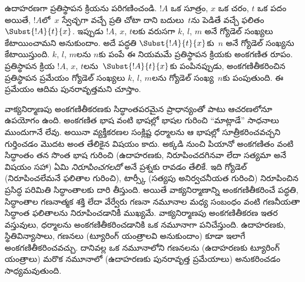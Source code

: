 \documentclass[../../../include/open-logic-section]{subfiles}
\begin{document}
ఉదాహరణగా ప్రతిస్థాపన క్రియను పరిగణించండి. $!A$ ఒక సూత్రం, $x$ ఒక చరం,
$t$ ఒక పదం అయితే, $!A$లో~$x$ స్వేచ్ఛగా వచ్చే ప్రతి చోటా దాని బదులు~$t$ను
పెడితే వచ్చే ఫలితం $\Subst{!A}{t}{x}$. ఇప్పుడు $!A$, $x$, $t$లకు వరుసగా
$k$, $l$, $m$ అనే గ్యోడెల్ సంఖ్యలు కేటాయించామని అనుకుందాం. అదే పద్ధతి
$\Subst{!A}{t}{x}$కు~$n$ అనే గ్యోడెల్ సంఖ్యను కేటాయిస్తుంది. $k$, $l$, $m$లను
$n$కు పంపే ఈ నియమమే ప్రతిస్థాపన క్రియకు అంకగణిత రూపం. ప్రతిస్థాపన
క్రియ $!A$, $x$, $t$లను~$\Subst{!A}{t}{x}$కు పంపినప్పుడు, అంకగణితీకరించిన
ప్రతిస్థాపన ప్రమేయం గ్యోడెల్ సంఖ్యలు $k$, $l$, $m$లను గ్యోడెల్ సంఖ్య~$n$కు
పంపుతుంది. ఈ ప్రమేయం ఆదిమ పునరావృత్తమని చూస్తాం.

వాక్యనిర్మాణపు అంకగణితీకరణకు సిద్ధాంతపరమైన ప్రాధాన్యంతో పాటు ఆచరణలోనూ ఉపయోగం
ఉంది. అంకగణిత భాష వంటి భాషల్లో భాషల గురించి ``మాట్లాడే'' సాధనాలు
ముందుగానే లేవు. అయినా వ్యక్తీకరణల సంక్లిష్ట ధర్మాలను ఆ భాషల్లో
సూత్రీకరించవచ్చని గుర్తించడం మొదట అంత తేలికైన విషయం కాదు. అక్కడి నుంచి పియానో అంకగణితం వంటి సిద్ధాంతం తన
సొంత భాష గురించి (ఉదాహరణకు, 
నిరూపించదగినవా లేదా సత్యమా అనే విషయం సహా) ఏమి \emph{నిరూపించగలదో}
అనే ప్రశ్నకు రావడం తేలికే. ఇది గ్యోడెల్ (నిరూపించలేమనే
ఫలితాల గురించి), టార్స్కీ (సత్యపు అనిర్వచనీయత గురించి) నిరూపించిన ప్రసిద్ధ
పరిమితి సిద్ధాంతాలకు దారి తీస్తుంది. అయితే వాక్యనిర్మాణాన్ని అంకగణితీకరించే పద్ధతి,
సిద్ధాంతాల గణనాత్మక శక్తి లేదా వేర్వేరు గణనా నమూనాల మధ్య సంబంధం వంటి
గణనీయతా సిద్ధాంత ఫలితాలను నిరూపించడానికీ ముఖ్యమే. వాక్యనిర్మాణపు
అంకగణితీకరణ ఇతర వస్తువులు, ధర్మాలను అంకగణితీకరించడానికి ఒక నమూనాగా
పనిచేస్తుంది. ఉదాహరణకు, స్థితివిన్యాసాలు, గణనలు (ట్యూరింగ్ యంత్రాలవి
అనుకుందాం) కూడా ఇలాగే అంకగణితీకరించవచ్చు. దానివల్ల ఒక నమూనాలోని
గణనలను (ఉదాహరణకు ట్యూరింగ్ యంత్రాలు) మరొక నమూనాలో (ఉదాహరణకు పునరావృత్త
ప్రమేయాలు) అనుకరించడం సాధ్యమవుతుంది.
\end{document}
